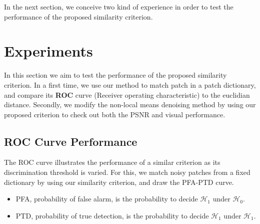 \documentclass[runningheads]{llncs}
\begin{document}
In the next section, we conceive two kind of experience in order to test the performance of the proposed similarity criterion.

\section{Experiments}
In this section we aim to test the performance of the proposed similarity criterion. In a first time, we use our method to match patch in a patch dictionary, and compare its \textbf{ROC} curve (Receiver operating characteristic) to the euclidian distance. Secondly, we modify the non-local means denoising method by using our proposed criterion to check out both the PSNR and visual performance.
\subsection{ROC Curve Performance}
The ROC curve illustrates the performance of a similar criterion as its discrimination threshold is varied. For this, we match noisy patches from a fixed dictionary by using our similarity criterion, and draw the PFA-PTD curve. 
\begin{itemize}
 \item PFA, probability of false alarm, is the probability to decide $\mathcal{H}_1$ under $\mathcal{H}_0$.
 \item PTD, probability of true detection, is the probability to decide $\mathcal{H}_1$ under $\mathcal{H}_1$.
\end{itemize}
\end{document}
